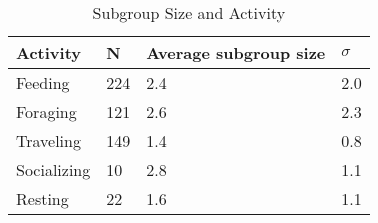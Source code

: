 \documentclass[american]{../../../coursework}
\begin{document}
\begin{table}
    \caption{Subgroup Size and Activity}
    \label{tbl:subgroup_activity}
    \begin{tabu} to \linewidth{XXXX}
        \toprule
        Activity & N & Average subgroup size & \(\sigma\) \\
        \midrule
        Feeding & 224 & 2.4 & 2.0 \\
        Foraging & 121 & 2.6 & 2.3 \\
        Traveling & 149 & 1.4 & 0.8 \\
        Socializing & 10 & 2.8 & 1.1 \\
        Resting & 22 & 1.6 & 1.1 \\
        \bottomrule
    \end{tabu}
    \par{}
\end{table}
\end{document}
